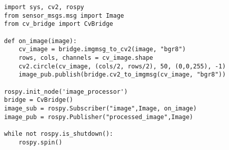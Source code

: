 \documentclass[compress]{beamer}
\begin{document}
%
%
%
%
%
%


\begin{frame}[containsverbatim]{}

\begin{verbatim}
import sys, cv2, rospy
from sensor_msgs.msg import Image
from cv_bridge import CvBridge

def on_image(image):
    cv_image = bridge.imgmsg_to_cv2(image, "bgr8")
    rows, cols, channels = cv_image.shape
    cv2.circle(cv_image, (cols/2, rows/2), 50, (0,0,255), -1)
    image_pub.publish(bridge.cv2_to_imgmsg(cv_image, "bgr8"))

rospy.init_node('image_processor')
bridge = CvBridge()
image_sub = rospy.Subscriber("image",Image, on_image)
image_pub = rospy.Publisher("processed_image",Image)

while not rospy.is_shutdown():
    rospy.spin()
\end{verbatim}

\end{frame}
\end{document}
